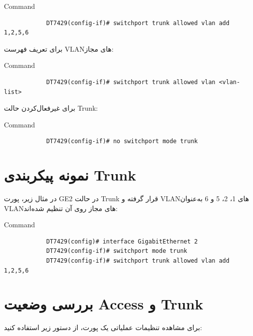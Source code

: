 \documentclass[11pt,letterpaper]{report}
\begin{document}
	\begin{latin}
		\begin{cliexample}{Command}
			\begin{verbatim}
			DT7429(config-if)# switchport trunk allowed vlan add 1,2,5,6
			\end{verbatim}
		\end{cliexample}
	\end{latin}
			برای تعریف فهرست VLANهای مجاز:

	\begin{latin}
		\begin{cliexample}{Command}
			\begin{verbatim}
			DT7429(config-if)# switchport trunk allowed vlan <vlan-list>
			\end{verbatim}
		\end{cliexample}
	\end{latin}
			برای غیرفعال‌کردن حالت Trunk:

	\begin{latin}
		\begin{cliexample}{Command}
			\begin{verbatim}
			DT7429(config-if)# no switchport mode trunk
			\end{verbatim}
		\end{cliexample}
	\end{latin}


	\section{نمونه پیکربندی Trunk}
			در مثال زیر، پورت GE2 در حالت Trunk قرار گرفته و VLANهای
		1، 2، 5 و 6 به‌عنوان VLANهای مجاز روی آن تنظیم شده‌اند:

	\begin{latin}
		\begin{cliexample}{Command}
			\begin{verbatim}
			DT7429(config)# interface GigabitEthernet 2
			DT7429(config-if)# switchport mode trunk
			DT7429(config-if)# switchport trunk allowed vlan add 1,2,5,6
			\end{verbatim}
		\end{cliexample}
	\end{latin}


	\section{بررسی وضعیت Access و Trunk}
			برای مشاهده تنظیمات عملیاتی یک پورت، از دستور زیر استفاده کنید:
\end{document}
